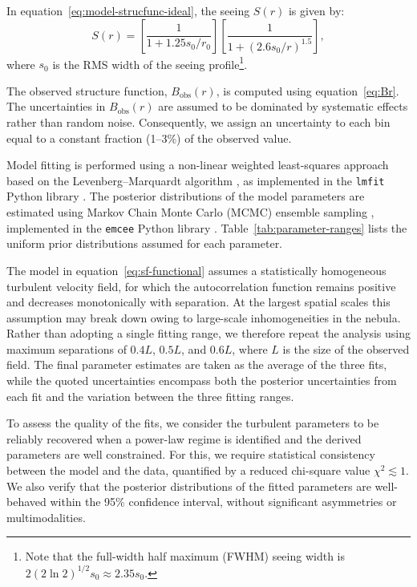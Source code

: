 \documentclass[fleqn,usenatbib, useAMS, a4paper]{mnras}
\newcommand\obs{\ensuremath{_{\mathrm{obs}}}}
\begin{document}
In equation~\eqref{eq:model-strucfunc-ideal}, the seeing \(S(r)\) is given by:
%
\begin{equation}\label{eq:ffs}
  S(r) =
  \left[ \frac{1}{1 + 1.25 s_0 / r_0} \right]
  \left[ \frac{1}{1 + (2.6 s_0 / r)^{1.5}} \right]
  ,
\end{equation}
where \(s_0\) is the RMS width of the seeing profile\footnote{%
  Note that the full-width half maximum (FWHM) seeing width is
  \(2 (2 \ln 2)^{1/2} s_0 \approx 2.35 s_0\).
}.

The observed structure function, \(B\obs(r)\), is computed using equation~\eqref{eq:Br}. 
The uncertainties in \(B\obs(r)\) are assumed to be dominated by systematic effects rather than random noise. Consequently, we assign an uncertainty to each bin equal to a constant fraction (1–3\%) of the observed value.

Model fitting is performed using a non-linear weighted least-squares approach based on the Levenberg–Marquardt algorithm \citep{More:1978a}, as implemented in the \texttt{lmfit} Python library \citep{newville_matthew_2014_11813}. 
The posterior distributions of the model parameters are estimated using Markov Chain Monte Carlo (MCMC) ensemble sampling \citep{2010CAMCS...5...65G}, implemented in the \texttt{emcee} Python library \citep{2013PASP..125..306F}.  
Table~\ref{tab:parameter-ranges} lists the uniform prior distributions assumed for each parameter.

The model in equation~\eqref{eq:sf-functional} assumes a statistically homogeneous turbulent velocity field, for which the autocorrelation function remains positive and decreases monotonically with separation.
At the largest spatial scales this assumption may break down owing to large-scale inhomogeneities in the nebula.
Rather than adopting a single fitting range, we therefore repeat the analysis using maximum separations of \(0.4L\), \(0.5L\), and \(0.6L\), where \(L\) is the size of the observed field.
The final parameter estimates are taken as the average of the three fits, while the quoted uncertainties encompass both the posterior uncertainties from each fit and the variation between the three fitting ranges.


To assess the quality of the fits, we consider the turbulent parameters to be reliably recovered when a power-law regime is identified and the derived parameters are well constrained. For this, we require statistical consistency between the model and the data, quantified by a reduced chi-square value \(\chi^2 \lesssim 1\). 
We also verify that the posterior distributions of the fitted parameters are well-behaved within the 95\% confidence interval, without significant asymmetries or multimodalities.
\end{document}
